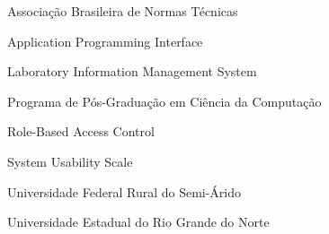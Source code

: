 
\begin{siglas}
  \item[ABNT]   Associação Brasileira de Normas Técnicas
  \item[API]    Application Programming Interface
  \item[LIMS]   Laboratory Information Management System
  \item[PPGCC]  Programa de Pós-Graduação em Ciência da Computação
  \item[RBAC]   Role-Based Access Control
  \item[SUS]    System Usability Scale
  \item[UFERSA] Universidade Federal Rural do Semi-Árido
  \item[UERN]   Universidade Estadual do Rio Grande do Norte
\end{siglas}
